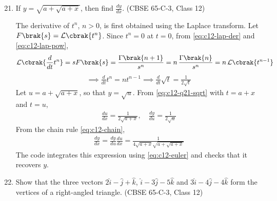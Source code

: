 \begin{enumerate}[label=\thesubsection.\arabic*., ref=\thesubsection.\theenumi]
\setcounter{enumi}{20}
\item If $y=\sqrt{a+\sqrt{a+x}}$, then find $\frac{dy}{dx}$.
\hfill (CBSE 65-C-3, Class 12)
 
\solution The derivative of $t^n$, $n>0$, is first obtained using the Laplace transform. Let $F\brak{s}=\mathcal{L}\cbrak{t^n}$. Since $t^n=0$ at $t=0$, from \eqref{eq:c12-lap-der} and \eqref{eq:c12-lap-pow},
\begin{align}
\mathcal{L}\cbrak{\frac{d}{dt}t^n} = sF\brak{s} = \frac{\Gamma\brak{n+1}}{s^{n}}
= n\,\frac{\Gamma\brak{n}}{s^{n}} = n\,\mathcal{L}\cbrak{t^{n-1}}
\end{align}
\begin{align}
\implies \frac{d}{dt}t^n = nt^{n-1}
\implies \frac{d}{dt}\sqrt{t} = \frac{1}{2\sqrt{t}}
\label{eq:c12-q21-sqrt}
\end{align}
Let $u=a+\sqrt{a+x}$, so that $y=\sqrt{u}$. From \eqref{eq:c12-q21-sqrt} with $t=a+x$ and $t=u$,
\begin{align}
\frac{du}{dx} = \frac{1}{2\sqrt{a+x}},\quad
\frac{dy}{du} = \frac{1}{2\sqrt{u}}
\end{align}
From the chain rule \eqref{eq:c12-chain},
\begin{align}
\frac{dy}{dx} = \frac{dy}{du}\frac{du}{dx}
= \frac{1}{4\sqrt{a+x}\sqrt{a+\sqrt{a+x}}}
\end{align}
The code integrates this expression using \eqref{eq:c12-euler} and checks that it recovers $y$.
 
\begin{center}
\end{center}
 
\item Show that the three vectors $2\hat{i}-\hat{j}+\hat{k}$, $\hat{i}-3\hat{j}-5\hat{k}$ and $3\hat{i}-4\hat{j}-4\hat{k}$ form the vertices of a right-angled triangle.
\hfill (CBSE 65-C-3, Class 12)
 

\end{enumerate}
